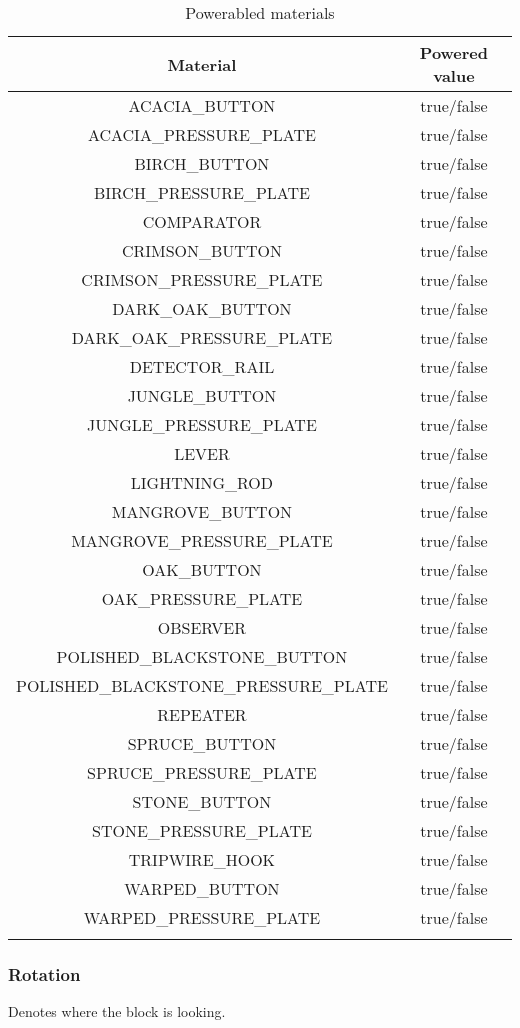 \begin{longtable}{ |c|c| }
	\hline
	Material & Powered value \\
	\hline
	\endhead
	ACACIA\_BUTTON & true/false \\
	ACACIA\_PRESSURE\_PLATE & true/false \\
	BIRCH\_BUTTON & true/false \\
	BIRCH\_PRESSURE\_PLATE & true/false \\
	COMPARATOR & true/false \\
	CRIMSON\_BUTTON & true/false \\
	CRIMSON\_PRESSURE\_PLATE & true/false \\
	DARK\_OAK\_BUTTON & true/false \\
	DARK\_OAK\_PRESSURE\_PLATE & true/false \\
	DETECTOR\_RAIL & true/false \\
	JUNGLE\_BUTTON & true/false \\
	JUNGLE\_PRESSURE\_PLATE & true/false \\
	LEVER & true/false \\
	LIGHTNING\_ROD & true/false \\
	MANGROVE\_BUTTON & true/false \\
	MANGROVE\_PRESSURE\_PLATE & true/false \\
	OAK\_BUTTON & true/false \\
	OAK\_PRESSURE\_PLATE & true/false \\
	OBSERVER & true/false \\
	POLISHED\_BLACKSTONE\_BUTTON & true/false \\
	POLISHED\_BLACKSTONE\_PRESSURE\_PLATE & true/false \\
	REPEATER & true/false \\
	SPRUCE\_BUTTON & true/false \\
	SPRUCE\_PRESSURE\_PLATE & true/false \\
	STONE\_BUTTON & true/false \\
	STONE\_PRESSURE\_PLATE & true/false \\
	TRIPWIRE\_HOOK & true/false \\
	WARPED\_BUTTON & true/false \\
	WARPED\_PRESSURE\_PLATE & true/false \\
	\hline
	\caption{Powerabled materials}
\end{longtable}

\subsubsection{Rotation}
Denotes where the block is looking.

